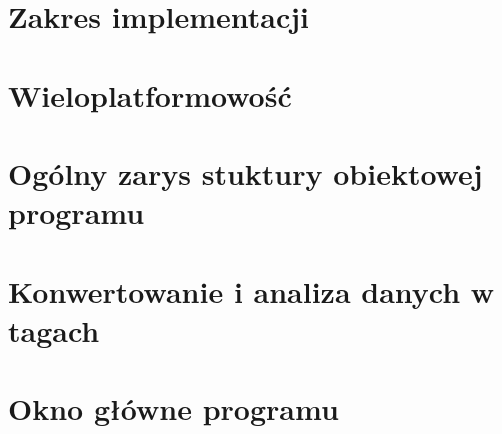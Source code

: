 

\section{Zakres implementacji}


\section{Wieloplatformowość}


\section{Ogólny zarys stuktury obiektowej programu}
\sokarclassExplanations


\section{Konwertowanie i analiza danych w tagach}


\section{}


\section{}


\section{}


\section{}


\section{Okno główne programu}

